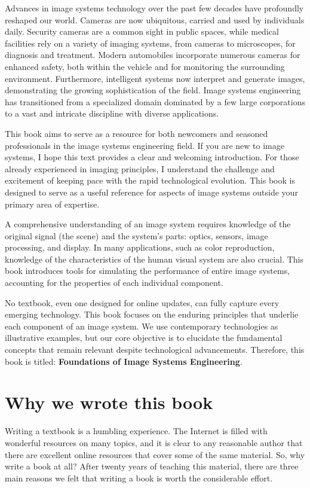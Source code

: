 \documentclass[
  letterpaper,
]{book}
\begin{document}
Advances in image systems technology over the past few decades have
profoundly reshaped our world. Cameras are now ubiquitous, carried and
used by individuals daily. Security cameras are a common sight in public
spaces, while medical facilities rely on a variety of imaging systems,
from cameras to microscopes, for diagnosis and treatment. Modern
automobiles incorporate numerous cameras for enhanced safety, both
within the vehicle and for monitoring the surrounding environment.
Furthermore, intelligent systems now interpret and generate images,
demonstrating the growing sophistication of the field. Image systems
engineering has transitioned from a specialized domain dominated by a
few large corporations to a vast and intricate discipline with diverse
applications.

This book aims to serve as a resource for both newcomers and seasoned
professionals in the image systems engineering field. If you are new to
image systems, I hope this text provides a clear and welcoming
introduction. For those already experienced in imaging principles, I
understand the challenge and excitement of keeping pace with the rapid
technological evolution. This book is designed to serve as a useful
reference for aspects of image systems outside your primary area of
expertise.

A comprehensive understanding of an image system requires knowledge of
the original signal (the scene) and the system's parts: optics, sensors,
image processing, and display. In many applications, such as color
reproduction, knowledge of the characteristics of the human visual
system are also crucial. This book introduces tools for simulating the
performance of entire image systems, accounting for the properties of
each individual component.

No textbook, even one designed for online updates, can fully capture
every emerging technology. This book focuses on the enduring principles
that underlie each component of an image system. We use contemporary
technologies as illustrative examples, but our core objective is to
elucidate the fundamental concepts that remain relevant despite
technological advancements. Therefore, this book is titled:
\textbf{Foundations of Image Systems Engineering}.

\section{Why we wrote this book}\label{why-we-wrote-this-book}

Writing a textbook is a humbling experience. The Internet is filled with
wonderful resources on many topics, and it is clear to any reasonable
author that there are excellent online resources that cover some of the
same material. So, why write a book at all? After twenty years of
teaching this material, there are three main reasons we felt that
writing a book is worth the considerable effort.
\end{document}
